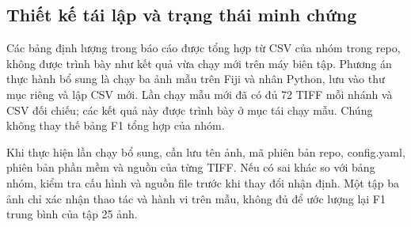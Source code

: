 \subsection{Thiết kế tái lập và trạng thái minh chứng}
Các bảng định lượng trong báo cáo được tổng hợp từ CSV của nhóm trong repo, không được trình bày như kết quả vừa chạy mới trên máy biên tập. Phương án thực hành bổ sung là chạy ba ảnh mẫu trên Fiji và nhân Python, lưu vào thư mục riêng và lập CSV mới. Lần chạy mẫu mới đã có đủ 72 TIFF mỗi nhánh và CSV đối chiếu; các kết quả này được trình bày ở mục tái chạy mẫu. Chúng không thay thế bảng F1 tổng hợp của nhóm.

Khi thực hiện lần chạy bổ sung, cần lưu tên ảnh, mã phiên bản repo, config.yaml, phiên bản phần mềm và nguồn của từng TIFF. Nếu có sai khác so với bảng nhóm, kiểm tra cấu hình và nguồn file trước khi thay đổi nhận định. Một tập ba ảnh chỉ xác nhận thao tác và hành vi trên mẫu, không đủ để ước lượng lại F1 trung bình của tập 25 ảnh.
